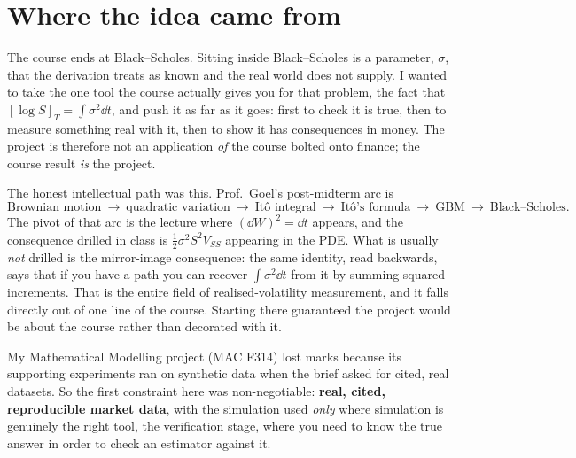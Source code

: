 \documentclass[11pt,a4paper]{article}
\begin{document}
\section{Where the idea came from}

\begin{qabox}
The course ends at Black--Scholes. Sitting inside Black--Scholes is a parameter, $\sigma$,
that the derivation treats as known and the real world does not supply. I wanted to take the
one tool the course actually gives you for that problem, the fact that
$[\log S]_T=\int\sigma^2\dd t$, and push it as far as it goes: first to check it is true,
then to measure something real with it, then to show it has consequences in money. The project
is therefore not an application \emph{of} the course bolted onto finance; the course result
\emph{is} the project.
\end{qabox}

The honest intellectual path was this. Prof.\ Goel's post-midterm arc is
\[
\text{Brownian motion}\ \to\ \text{quadratic variation}\ \to\ \text{It\^o integral}
\ \to\ \text{It\^o's formula}\ \to\ \text{GBM}\ \to\ \text{Black--Scholes}.
\]
The pivot of that arc is the lecture where $(\dd W)^2=\dd t$ appears, and the consequence
drilled in class is $\tfrac12\sigma^2 S^2 V_{SS}$ appearing in the PDE. What is usually
\emph{not} drilled is the mirror-image consequence: the same identity, read backwards, says
that if you have a path you can recover $\int\sigma^2\dd t$ from it by summing squared
increments. That is the entire field of realised-volatility measurement, and it falls directly
out of one line of the course. Starting there guaranteed the project would be about the course
rather than decorated with it.

\begin{keybox}
My Mathematical Modelling project (MAC F314) lost marks because its supporting experiments ran
on synthetic data when the brief asked for cited, real datasets. So the first constraint here
was non-negotiable: \textbf{real, cited, reproducible market data}, with the simulation used
\emph{only} where simulation is genuinely the right tool, the verification stage, where you need to know the true
answer in order to check an estimator against it.
\end{keybox}

\end{document}
